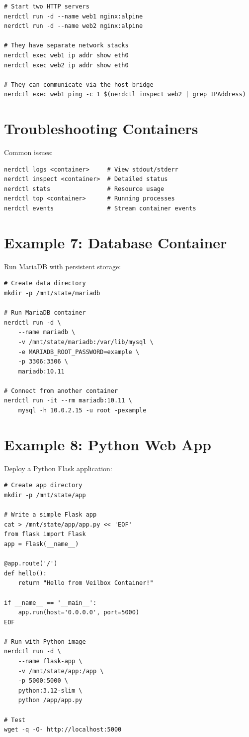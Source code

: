\begin{lstlisting}
# Start two HTTP servers
nerdctl run -d --name web1 nginx:alpine
nerdctl run -d --name web2 nginx:alpine

# They have separate network stacks
nerdctl exec web1 ip addr show eth0
nerdctl exec web2 ip addr show eth0

# They can communicate via the host bridge
nerdctl exec web1 ping -c 1 $(nerdctl inspect web2 | grep IPAddress)
\end{lstlisting}

\section{Troubleshooting Containers}

Common issues:
\begin{lstlisting}
nerdctl logs <container>     # View stdout/stderr
nerdctl inspect <container>  # Detailed status
nerdctl stats                # Resource usage
nerdctl top <container>      # Running processes
nerdctl events               # Stream container events
\end{lstlisting}


\section{Example 7: Database Container}

Run MariaDB with persistent storage:

\begin{lstlisting}
# Create data directory
mkdir -p /mnt/state/mariadb

# Run MariaDB container
nerdctl run -d \
    --name mariadb \
    -v /mnt/state/mariadb:/var/lib/mysql \
    -e MARIADB_ROOT_PASSWORD=example \
    -p 3306:3306 \
    mariadb:10.11

# Connect from another container
nerdctl run -it --rm mariadb:10.11 \
    mysql -h 10.0.2.15 -u root -pexample
\end{lstlisting}

\section{Example 8: Python Web App}

Deploy a Python Flask application:

\begin{lstlisting}
# Create app directory
mkdir -p /mnt/state/app

# Write a simple Flask app
cat > /mnt/state/app/app.py << 'EOF'
from flask import Flask
app = Flask(__name__)

@app.route('/')
def hello():
    return "Hello from Veilbox Container!"

if __name__ == '__main__':
    app.run(host='0.0.0.0', port=5000)
EOF

# Run with Python image
nerdctl run -d \
    --name flask-app \
    -v /mnt/state/app:/app \
    -p 5000:5000 \
    python:3.12-slim \
    python /app/app.py

# Test
wget -q -O- http://localhost:5000
\end{lstlisting}


